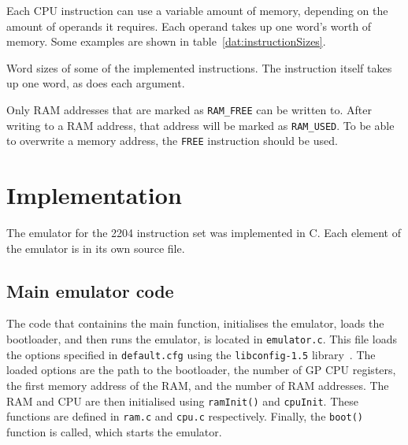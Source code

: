 \documentclass[a4paper,11pt]{article}
\begin{document}
    Each CPU instruction can use a variable amount of memory, depending on the amount of operands it requires. Each operand takes up one word's worth of memory. Some examples are shown in table~\ref{dat:instructionSizes}.
    
    \begin{table}[h]
    \centering
        \label{dat:instructionSizes}
        \caption{Word sizes of some of the implemented instructions. The instruction itself takes up one word, as does each argument.}
    \end{table}
    
    Only RAM addresses that are marked as \lstinline{RAM_FREE} can be written to. After writing to a RAM address, that address will be marked as \lstinline{RAM_USED}. To be able to overwrite a memory address, the \lstinline{FREE} instruction should be used.

\section{Implementation}
    The emulator for the 2204 instruction set was implemented in C. Each element of the emulator is in its own source file.
    
    \subsection{Main emulator code}
        The code that containins the main function, initialises the emulator, loads the bootloader, and then runs the emulator, is located in \lstinline{emulator.c}. This file loads the options specified in \lstinline{default.cfg} using the \lstinline{libconfig-1.5} library~\cite{libconfig}. The loaded options are the path to the bootloader, the number of GP CPU registers, the first memory address of the RAM, and the number of RAM addresses. The RAM and CPU are then initialised using \lstinline{ramInit()} and \lstinline{cpuInit}. These functions are defined in \lstinline{ram.c} and \lstinline{cpu.c} respectively. Finally, the \lstinline{boot()} function is called, which starts the emulator.
    
\end{document}
